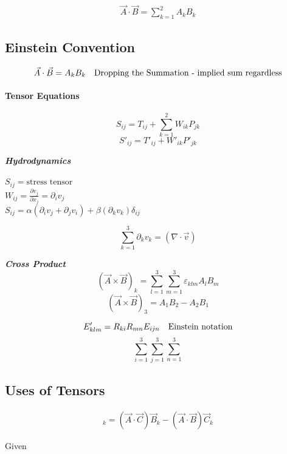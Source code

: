 \documentclass[svgnames]{article}   	%
\begin{document}
\begin{align*}
  \vec{A} \cdot \vec{B} = \sum_{k=1}^2 A_k B_k 
\end{align*}

\subsection{Einstein Convention}

\[ \vec{A} \cdot \vec{B} = A_k B_k \hspace{10px} \text{Dropping the Summation
- implied sum regardless}
\]

\paragraph{Tensor Equations}

\[
  S_{ij} = T_{ij} + \sum_{k=1}^2 W_{ik}P_{jk}
\]
\[
  S'_{ij} = T'_{ij} + W'_{ik} P'_{jk}
\]

\textbf{ \textit{Hydrodynamics}}
\mbox{}\\\\
\noindent $S_{ij} = \text{stress tensor}$
\mbox{}\\
$W_{ij} = \frac{\partial v_j}{\partial x_j} = \partial_i v_j$ 
\mbox{}\\
$S_{ij} = \alpha (\partial_i v_j + \partial_j v_i) + \beta (\partial_k
v_k)\delta_{ij}$

\[
  \sum_{k=1}^{3} \partial_k v_k = (\nabla \cdot \vec{v})
\]

\textit{ \textbf{Cross Product}}
\[
(\vec{A} \times \vec{B})_k = \sum_{l=1}^{3} \sum_{m=1}^{3}  \varepsilon_{klm}
A_l B_m
\]
\[
  (\vec{A} \times \vec{B})_3 = A_1B_2 - A_2B_1 
\]

\[
  E'_{klm} = R_{ki} R_{mn} E_{ijn} \hspace{10px} \text{Einstein notation}
\]
\[
 \sum_{i=1}^{3}  \sum_{j=1}^{3}  \sum_{n=1}^{3}   
\]

\subsection{Uses of Tensors}  

\begin{align*}
  [\vec{A} \times (\vec{B} \times \vec{C})]_k = (\vec{A} \cdot
  \vec{C})\vec{B}_k
  - (\vec{A} \cdot \vec{B})\vec{C}_k        
\end{align*}

Given 
\end{document}

